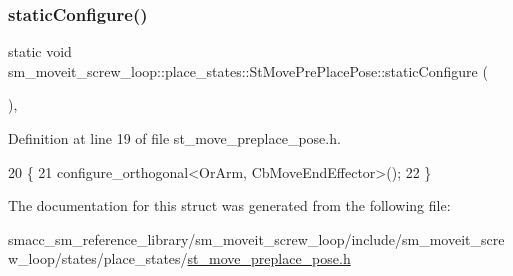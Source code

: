 \subsubsection{\texorpdfstring{static\+Configure()}{staticConfigure()}}
{\footnotesize\ttfamily static void sm\+\_\+moveit\+\_\+screw\+\_\+loop\+::place\+\_\+states\+::\+St\+Move\+Pre\+Place\+Pose\+::static\+Configure (\begin{DoxyParamCaption}{ }\end{DoxyParamCaption})\hspace{0.3cm}{\ttfamily [inline]}, {\ttfamily [static]}}



Definition at line 19 of file st\+\_\+move\+\_\+preplace\+\_\+pose.\+h.


\begin{DoxyCode}
20             \{
21                 configure\_orthogonal<OrArm, CbMoveEndEffector>();
22             \}
\end{DoxyCode}


The documentation for this struct was generated from the following file\+:\begin{DoxyCompactItemize}
\item 
smacc\+\_\+sm\+\_\+reference\+\_\+library/sm\+\_\+moveit\+\_\+screw\+\_\+loop/include/sm\+\_\+moveit\+\_\+screw\+\_\+loop/states/place\+\_\+states/\hyperlink{sm__moveit__screw__loop_2include_2sm__moveit__screw__loop_2states_2place__states_2st__move__preplace__pose_8h}{st\+\_\+move\+\_\+preplace\+\_\+pose.\+h}\end{DoxyCompactItemize}
